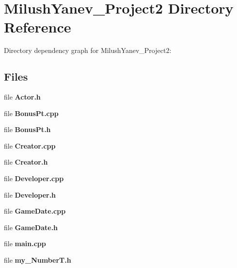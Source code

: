 \section{Milush\+Yanev\+\_\+\+Project2 Directory Reference}
\label{dir_c1bbee082248adaefd0ed0e8e47bef05}
Directory dependency graph for Milush\+Yanev\+\_\+\+Project2\+:
\subsection*{Files}
\begin{DoxyCompactItemize}
\item 
file {\bf Actor.\+h}
\item 
file {\bf Bonus\+Pt.\+cpp}
\item 
file {\bf Bonus\+Pt.\+h}
\item 
file {\bf Creator.\+cpp}
\item 
file {\bf Creator.\+h}
\item 
file {\bf Developer.\+cpp}
\item 
file {\bf Developer.\+h}
\item 
file {\bf Game\+Date.\+cpp}
\item 
file {\bf Game\+Date.\+h}
\item 
file {\bf main.\+cpp}
\item 
file {\bf my\+\_\+\+Number\+T.\+h}
\end{DoxyCompactItemize}
